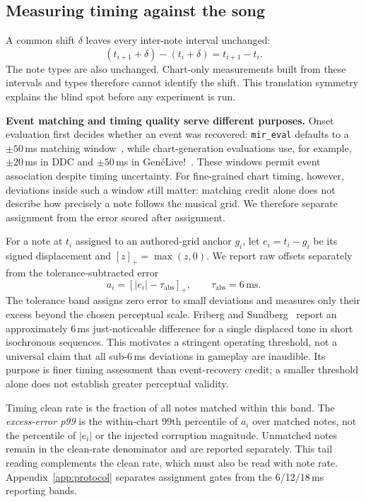 \documentclass[10pt,twocolumn]{article}
\begin{document}
\subsection{Measuring timing against the song}\label{sec:timingmethod}

A common shift $\delta$ leaves every inter-note interval unchanged:
\begin{equation}
(t_{i+1}+\delta)-(t_i+\delta)=t_{i+1}-t_i.
\label{eq:shift-invariance}
\end{equation}
The note types are also unchanged. Chart-only measurements built from
these intervals and types therefore cannot identify the shift. This
translation symmetry explains the blind spot before any experiment is run.

\textbf{Event matching and timing quality serve different purposes.}
Onset evaluation first decides whether an event was recovered:
\texttt{mir\_eval} defaults to a $\pm50$\,ms matching
window~\cite{mirevalOnset}, while chart-generation evaluations use, for
example, $\pm20$\,ms in DDC and $\pm50$\,ms in
Gen\'eLive!~\cite{donahue2017ddc,takada2023genelive}.
These windows permit event association despite timing uncertainty.
For fine-grained chart timing, however, deviations inside such a window still
matter: matching credit alone does not describe how precisely a note follows
the musical grid. We therefore separate assignment from the error scored
after assignment.

For a note at $t_i$ assigned to an authored-grid anchor $g_i$, let
$e_i=t_i-g_i$ be its signed displacement and $[z]_+=\max(z,0)$.
We report raw offsets separately from the tolerance-subtracted error
\begin{equation}
 a_i=[|e_i|-\tau_{\mathrm{abs}}]_+,\qquad
 \tau_{\mathrm{abs}}=6\,\mathrm{ms}.
 \label{eq:excess-error}
\end{equation}
The tolerance band assigns zero error to small deviations and measures only
their excess beyond the chosen perceptual scale. Friberg and
Sundberg~\cite{friberg1995jnd} report an approximately 6\,ms just-noticeable
difference for a single displaced tone in short isochronous sequences.
This motivates a stringent operating threshold, not a universal claim that
all sub-6\,ms deviations in gameplay are inaudible. Its purpose is finer
timing assessment than event-recovery credit; a smaller threshold alone does
not establish greater perceptual validity.

Timing clean rate is the fraction of all notes matched within this band.
The \emph{excess-error p99} is the within-chart 99th percentile of $a_i$
over matched notes, not the percentile of $|e_i|$ or the injected corruption
magnitude. Unmatched notes remain in the clean-rate denominator and are
reported separately. This tail reading complements the clean rate, which
must also be read with note rate. Appendix~\ref{app:protocol} separates
assignment gates from the 6/12/18\,ms reporting bands.
\end{document}
